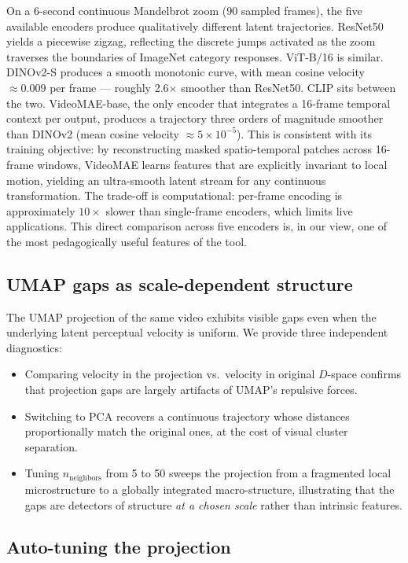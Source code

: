 \documentclass[11pt,a4paper]{article}
\begin{document}
On a 6-second continuous Mandelbrot zoom (90 sampled frames), the
five available encoders produce qualitatively different latent
trajectories. ResNet50 yields a piecewise zigzag, reflecting the
discrete jumps activated as the zoom traverses the boundaries of
ImageNet category responses. ViT-B/16 is similar. DINOv2-S produces
a smooth monotonic curve, with mean cosine velocity
$\approx 0.009$ per frame --- roughly 2.6$\times$ smoother than
ResNet50. CLIP sits between the two. VideoMAE-base, the only
encoder that integrates a 16-frame temporal context per output,
produces a trajectory three orders of magnitude smoother than
DINOv2 (mean cosine velocity $\approx 5\times 10^{-5}$). This is
consistent with its training objective: by reconstructing masked
spatio-temporal patches across 16-frame windows, VideoMAE learns
features that are explicitly invariant to local motion, yielding an
ultra-smooth latent stream for any continuous transformation. The
trade-off is computational: per-frame encoding is approximately
$10\times$ slower than single-frame encoders, which limits live
applications. This direct comparison across five encoders is, in
our view, one of the most pedagogically useful features of the
tool.

\subsection{UMAP gaps as scale-dependent structure}

The UMAP projection of the same video exhibits visible gaps even
when the underlying latent perceptual velocity is uniform. We
provide three independent diagnostics:
\begin{itemize}[leftmargin=*,topsep=2pt]
    \item Comparing velocity in the projection vs.\ velocity in
    original $D$-space confirms that projection gaps are largely
    artifacts of UMAP's repulsive forces.
    \item Switching to PCA recovers a continuous trajectory whose
    distances proportionally match the original ones, at the cost of
    visual cluster separation.
    \item Tuning $n_{\text{neighbors}}$ from 5 to 50 sweeps the
    projection from a fragmented local microstructure to a globally
    integrated macro-structure, illustrating that the gaps are
    detectors of structure \emph{at a chosen scale} rather than
    intrinsic features.
\end{itemize}

\subsection{Auto-tuning the projection}
\end{document}
